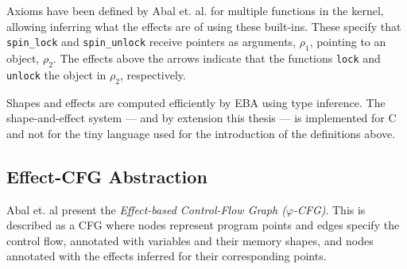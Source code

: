 \newpar Axioms have been defined by Abal et. al. for multiple functions in the kernel, allowing inferring what the effects are of using these built-ins. These specify that \texttt{spin\_lock} and \texttt{spin\_unlock} receive pointers as arguments, $\rho_1$, pointing to an object, $\rho_2$. The effects above the arrows indicate that the functions \texttt{lock} and \texttt{unlock} the object in $\rho_2$, respectively.

\newpar Shapes and effects are computed efficiently by EBA using type inference. The shape-and-effect system --- and by extension this thesis --- is implemented for C and not for the tiny language used for the introduction of the definitions above.

\subsection{Effect-CFG Abstraction}
Abal et. al present the \textit{Effect-based Control-Flow Graph ($\varphi$-CFG)}. This is described as a CFG where nodes represent program points and edges specify the control flow, annotated with variables and their memory shapes, and nodes annotated with the effects inferred for their corresponding points.  
